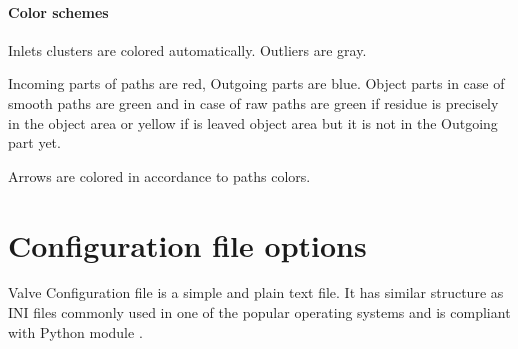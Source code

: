 \documentclass[a4paper,10pt,english]{sphinxmanual}
\begin{document}
\subsubsection{Color schemes}
\label{valve/valve_manual:color-schemes}
Inlets clusters are colored automatically. Outliers are gray.

Incoming parts of paths are red, Outgoing parts are blue. Object parts in case of smooth paths are green and in case of raw paths are green if residue is precisely in the object area or yellow if is leaved object area but it is not in the Outgoing part yet.

Arrows are colored in accordance to paths colors.


\chapter{Configuration file options}
\label{valve/valve_config::doc}\label{valve/valve_config:configuration-file-options}
Valve Configuration file is a simple and plain text file. It has similar structure as INI files commonly used in one of the popular operating systems and is compliant with Python module \href{http://docs.python.org/2/library/configparser.html\#module-ConfigParser}{}.
\end{document}
